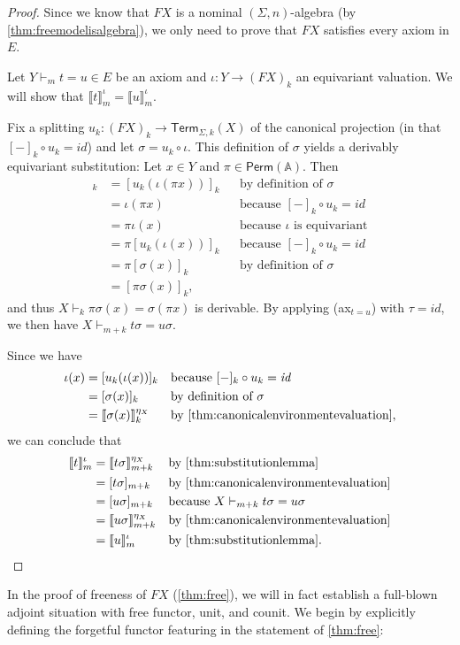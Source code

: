 \documentclass[11pt,a4paper]{amsart}
\newcommand{\Perm}{\mathsf{Perm}(\Names)}
\newcommand{\Term}{\mathsf{Term}}
\newcommand{\sig}{\Sigma}
\newcommand{\Names}{\mathbb{A}}
\theoremstyle{plain}
\newcommand{\id}{\mathit{id}}
\numberwithin{equation}{section}
\newcommand{\+}[1]{\mathcal{#1}\xspace}
\theoremstyle{definition}
\begin{document}
\begin{proof}
    Since we know that \(FX\) is a nominal \((\sig, n)\)-algebra (by \cref{thm:freemodelisalgebra}), we only need to prove that \(FX\) satisfies every axiom in \(E\).

    Let \(Y \vdash_m t = u \in E\) be an axiom and \(\iota: Y \to (FX)_k\) an equivariant valuation.
    We will show that \(\llbracket t \rrbracket^\iota_m = \llbracket u \rrbracket^\iota_m\).

    Fix a splitting \(u_k: (FX)_k \to \Term_{\sig, k}(X)\) of the canonical projection (in that \([-]_k \circ u_k = \id\)) and let \(\sigma = u_k \circ \iota\).
    This definition of \(\sigma\) yields a derivably equivariant substitution:
    Let \(x \in Y\) and \(\pi \in \Perm\).
    Then
    \begin{align*}
        [\sigma(\pi x)]_k
        &= [u_k(\iota(\pi x))]_k && \text{by definition of } \sigma \\
        &= \iota(\pi x) && \text{because } [-]_k \circ u_k = \id \\
        &= \pi \iota(x) && \text{because } \iota \text{ is equivariant} \\
        &= \pi[u_k(\iota(x))]_k && \text{because } [-]_k \circ u_k = \id \\
        &= \pi[\sigma(x)]_k && \text{by definition of } \sigma \\
        &= [\pi \sigma(x)]_k, &&
    \end{align*}
    and thus \(X \vdash_k \pi \sigma(x) = \sigma(\pi x)\) is derivable.
    By applying (ax$_{t = u}$) with \(\tau = \id\), we then have \(X \vdash_{m + k} t\sigma = u\sigma\).

    Since we have
    \begin{align*}
        \iota(x)
        &= [u_k(\iota(x))]_k && \text{because } [-]_k \circ u_k = \id \\
        &= [\sigma(x)]_k && \text{by definition of } \sigma \\
        &= \llbracket \sigma(x) \rrbracket^{\eta_X}_k && \text{by \cref{thm:canonicalenvironmentevaluation}},
    \end{align*}
    we can conclude that
    \begin{align*}
        \llbracket t \rrbracket^\iota_m
        &= \llbracket t\sigma \rrbracket^{\eta_X}_{m + k} && \text{by \cref{thm:substitutionlemma}} \\
        &= [t\sigma]_{m + k} && \text{by \cref{thm:canonicalenvironmentevaluation}} \\
        &= [u\sigma]_{m + k} && \text{because } X \vdash_{m + k} t\sigma = u\sigma \\
        &= \llbracket u\sigma \rrbracket^{\eta_X}_{m + k} && \text{by \cref{thm:canonicalenvironmentevaluation}} \\
        &= \llbracket u \rrbracket^\iota_m && \text{by \cref{thm:substitutionlemma}}.
    \end{align*}
\end{proof}
\noindent In the proof of freeness of $FX$ (\cref{thm:free}), we
will in fact establish a full-blown adjoint situation with free
functor, unit, and counit. We begin by explicitly defining the
forgetful functor featuring in the statement of \cref{thm:free}:
\end{document}
